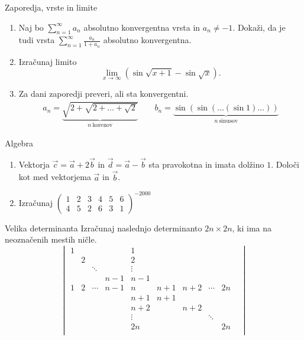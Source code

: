 \begin{frame}{Zaporedja, vrste in limite}
	\begin{enumerate}
		\item 
		Naj bo $\sum_{n=1}^{\infty} a_n$ absolutno konvergentna vrsta in $a_n \ne -1$.
		Dokaži, da je tudi vrsta $\sum_{n=1}^\infty \frac{a_n}{1+a_n}$
		absolutno konvergentna.

		\item
		Izračunaj limito
		\[\lim_{x \to \infty} (\sin \sqrt{x+1} - \sin \sqrt{x}).\]

		\item
		Za dani zaporedji preveri, ali sta konvergentni.
		\begin{align*}
			a_n = \underbrace{\sqrt{2+\sqrt{2+\dots+\sqrt{2}}}}_{n~\text{korenov}} \qquad
			b_n = \underbrace{\sin(\sin(\dots(\sin 1)\dots))}_{n~\text{sinusov}}
		\end{align*}
	\end{enumerate}
\end{frame}

\begin{frame}{Algebra}
	\begin{enumerate}
		\item
		Vektorja $\vec{c} =\vec{a}+ 2 \vec{b} $ in $\vec{d} =\vec{a}- \vec{b} $
		sta pravokotna in imata dolžino $1$. Določi kot med vektorjema $\vec{a}$ in $\vec{b}$.
		\item 
		Izračunaj
		$\begin{pmatrix}
			1 & 2 & 3 & 4 & 5 & 6\\
			4 & 5 & 2 & 6 & 3 & 1
			\end{pmatrix}^{-2000}	
		$
	\end{enumerate}
\end{frame}

\begin{frame}{Velika determinanta}
	Izračunaj naslednjo determinanto $2n \times 2n$, ki ima na neoznačenih mestih ničle.
	$$\begin{vmatrix}
		1 & & & & 1 & & & & \\
		& 2 & & & 2 & & & & \\
		& &\ddots & & \vdots & & & & &\\
		& & & n-1 & n-1 & & & & \\
		1 & 2 & \cdots & n-1 & n & n+1 & n+2 & \cdots & 2n\\
		& & & & n+1 & n+1 & & & \\
		& & & & n+2 & & n+2 & & \\
		& & & & \vdots & & & \ddots & \\
		& & & & 2n & & & & 2n\\
		\end{vmatrix}$$
\end{frame}

